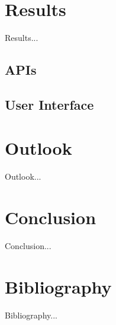 \documentclass[a4paper, 12pt, headsepline]{scrartcl}
\begin{document}
\section{Results}
Results...

\subsection{APIs}


\subsection{User Interface}

\section{Outlook}
Outlook...

\section{Conclusion}
Conclusion...

\section{Bibliography}
Bibliography...
\end{document}
